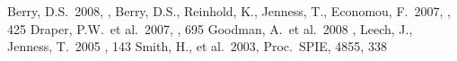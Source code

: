 \documentclass[11pt,twoside]{article}  %
\begin{document}
%
\begin{references}
 Berry, D.S.\ 2008, \adassxvii, 
 Berry, D.S., Reinhold, K., Jenness, T., Economou, F.\ 2007,
           \adassxvi, 425
 Draper, P.W.\ et al.\ 2007, \adassxvi, 695
 Goodman, A.\ et al.\ 2008 \adassxvii, 
 Leech, J., Jenness, T.\ 2005 \adassxiv, 143
 Smith, H., et al.\ 2003, Proc.\ SPIE, 4855, 338
\end{references}

\end{document}
